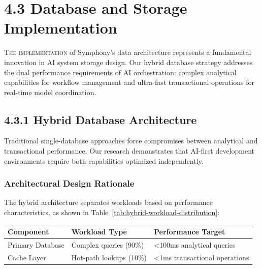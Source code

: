 
\section{4.3 Database and Storage Implementation}
\label{sec:database-impl}

\vspace{0.3cm}
\lettrine{T}{he implementation} of Symphony's data architecture represents a fundamental innovation in AI system storage design. Our hybrid database strategy addresses the dual performance requirements of AI orchestration: complex analytical capabilities for workflow management and ultra-fast transactional operations for real-time model coordination.

\subsection*{4.3.1 Hybrid Database Architecture}

Traditional single-database approaches force compromises between analytical and transactional performance. Our research demonstrates that AI-first development environments require both capabilities optimized independently.

\subsubsection*{Architectural Design Rationale}

The hybrid architecture separates workloads based on performance characteristics, as shown in Table~\ref{tab:hybrid-workload-distribution}:

\begin{center}
\begin{tabular}{@{}lll@{}}
\toprule
\textbf{Component} & \textbf{Workload Type} & \textbf{Performance Target} \\
\midrule
Primary Database & Complex queries (90\%) & <100ms analytical queries \\
Cache Layer & Hot-path lookups (10\%) & <1ms transactional operations \\
\bottomrule
\end{tabular}
\label{tab:hybrid-workload-distribution}
\end{center}

